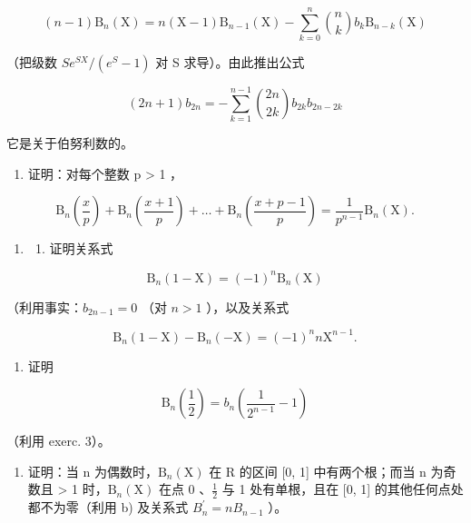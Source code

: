 \[
(n - 1) \mathrm{B} _ {n} (\mathrm{X}) = n (\mathrm{X} - 1) \mathrm{B} _ {n - 1} (\mathrm{X}) - \sum_ {k = 0} ^ {n} \binom {n} {k} b _ {k}   \mathrm{B} _ {n - k} (\mathrm{X})
\]

（把级数 \(Se^{SX}/(e^{S}-1)\) 对 S 求导）。由此推出公式

\[
(2 n + 1) b _ {2 n} = - \sum_ {k = 1} ^ {n - 1} \binom {2 n} {2 k} b _ {2 k}   b _ {2 n - 2 k}
\]

它是关于伯努利数的。

\begin{enumerate}
\def\labelenumi{\arabic{enumi})}
\setcounter{enumi}{2}
\tightlist
\item
  证明：对每个整数 p \textgreater{} 1 ，
\end{enumerate}

\[
\mathrm{B} _ {n} \left(\frac {x}{p}\right) + \mathrm{B} _ {n} \left(\frac {x + 1}{p}\right) + \dots + \mathrm{B} _ {n} \left(\frac {x + p - 1}{p}\right) = \frac {1}{p ^ {n - 1}} \mathrm{B} _ {n} (\mathrm{X}).
\]

\begin{enumerate}
\def\labelenumi{\arabic{enumi})}
\setcounter{enumi}{3}
\tightlist
\item
  \begin{enumerate}
  \def\labelenumii{\alph{enumii})}
  \tightlist
  \item
    证明关系式
  \end{enumerate}
\end{enumerate}

\[
\mathrm{B} _ {n} (1 - \mathrm{X}) = (- 1) ^ {n} \mathrm{B} _ {n} (\mathrm{X})
\]

（利用事实：\(b_{2n - 1} = 0\) （对 \(n > 1\) ），以及关系式

\[
\mathrm{B} _ {n} (1 - \mathrm{X}) - \mathrm{B} _ {n} (- \mathrm{X}) = (- 1) ^ {n} n \mathrm{X} ^ {n - 1}.
\]

\begin{enumerate}
\def\labelenumi{\alph{enumi})}
\setcounter{enumi}{1}
\tightlist
\item
  证明
\end{enumerate}

\[
\mathrm{B} _ {n} \left(\frac {1}{2}\right) = b _ {n} \left(\frac {1}{2 ^ {n - 1}} - 1\right)
\]

（利用 exerc. 3）。

\begin{enumerate}
\def\labelenumi{\alph{enumi})}
\setcounter{enumi}{2}
\tightlist
\item
  证明：当 n 为偶数时，\(\mathrm{B}_{n}(\mathrm{X})\) 在 R 的区间 {[}0, 1{]} 中有两个根；而当 n 为奇数且 \textgreater{} 1 时，\(\mathrm{B}_{n}(\mathrm{X})\) 在点 0 、\(\frac{1}{2}\) 与 1 处有单根，且在 {[}0, 1{]} 的其他任何点处都不为零（利用 b) 及关系式 \(B_{n}^{\prime}=nB_{n-1}\) ）。
\end{enumerate}

